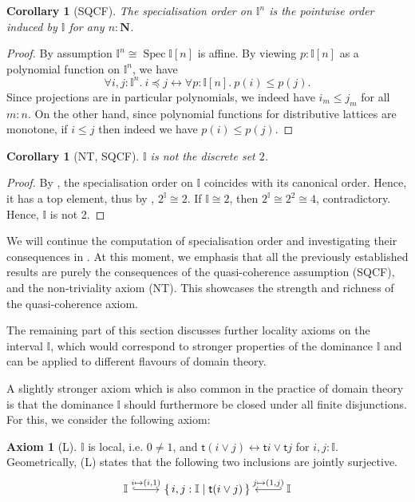 \documentclass[12pt]{amsart}
\newtheorem{corollary}[theorem]{Corollary}
\theoremstyle{definition}
\newtheorem*{axiom}{Axiom}
\newcommand{\mb}[1]{\mathbf{#1}}
\newcommand{\mbb}[1]{\mathbb{#1}}
\newcommand{\I}{\mbb I}
\newcommand{\ms}[1]{\mathsf{#1}}
\newcommand{\scomp}[2]{\{\,#1\mid#2\,\}}
\newcommand{\N}{\mb N}
\newcommand{\fa}[2]{\forall #1\!\colon\!\!#2.\ }
\newcommand{\eq}{\leftrightarrow}
\newcommand{\spec}{\operatorname{Spec}}
\begin{document}
\begin{corollary}[SQCF]\label{cor:pointwisecubeorder}
  The specialisation order on $\I^n$ is the pointwise order induced by $\I$ for any $n : \N$.
\end{corollary}
\begin{proof}
  By assumption $\I^n \cong \spec\I[n]$ is affine. By viewing $p : \I[n]$ as a polynomial function on $\I^n$, we have
  \[ \fa{i,j}{\I^n} i \preceq j \eq \fa p{\I[n]} p(i) \le p(j). \]
  Since projections are in particular polynomials, we indeed have $i_m \le j_m$ for all $m : n$. On the other hand, since polynomial functions for distributive lattices are monotone, if $i \le j$ then indeed we have $p(i) \le p(j)$. 
\end{proof}

\begin{corollary}[NT, SQCF]\label{cor:intisnot2}
  $\I$ is not the discrete set $2$.
\end{corollary}
\begin{proof}
  By , the specialisation order on $\I$ coincides with its canonical order. Hence, it has a top element, thus by , $2^\I \cong 2$. If $\I \cong 2$, then $2^\I \cong 2^2 \cong 4$, contradictory. Hence, $\I$ is not 2.
\end{proof}

We will continue the computation of specialisation order and investigating their consequences in . At this moment, we emphasis that all the previously established results are purely the consequences of the quasi-coherence assumption (SQCF), and the non-triviality axiom (NT). This showcases the strength and richness of the quasi-coherence axiom.

The remaining part of this section discusses further locality axioms on the interval $\I$, which would correspond to stronger properties of the dominance $\I$ and can be applied to different flavours of domain theory. 

A slightly stronger axiom which is also common in the practice of domain theory is that the dominance $\I$ should furthermore be closed under all finite disjunctions. For this, we consider the following axiom:

\begin{axiom}[L]\label{ax:L}
  $\I$ is local, i.e. $0 \neq 1$, and $\ms t(i\vee j) \eq \ms ti \vee \ms tj$ for $i,j : \I$. Geometrically, (L) states that the following two inclusions are jointly surjective.
  \[ 
  \begin{tikzcd}
    \I \ar[r, hook, "{i \mapsto (i,1)}"] & \scomp{i,j : \I}{\ms t(i\vee j)} & \I \ar[l, hook', "{j \mapsto (1,j)}"']
  \end{tikzcd}
  \]
\end{axiom}
\end{document}
